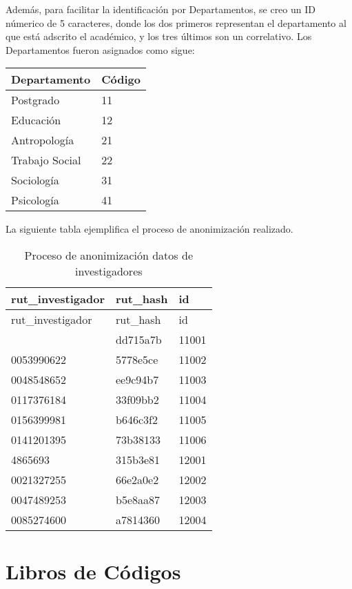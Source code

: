 \documentclass[
  spanish,
  letterpaper,
  DIV=11,
  numbers=noendperiod]{scrreprt}
\begin{document}
Además, para facilitar la identificación por Departamentos, se creo un
ID númerico de 5 caracteres, donde los dos primeros representan el
departamento al que está adscrito el académico, y los tres últimos son
un correlativo. Los Departamentos fueron asignados como sigue:

\begin{longtable}[]{@{}ll@{}}
\toprule\noalign{}
Departamento & Código \\
\midrule\noalign{}
\endhead
\bottomrule\noalign{}
\endlastfoot
Postgrado & 11 \\
Educación & 12 \\
Antropología & 21 \\
Trabajo Social & 22 \\
Sociología & 31 \\
Psicología & 41 \\
\end{longtable}

La siguiente tabla ejemplifica el proceso de anonimización realizado.

\begin{longtable}[]{@{}lll@{}}
\caption{Proceso de anonimización datos de
investigadores}\tabularnewline
\toprule\noalign{}
rut\_investigador & rut\_hash & id \\
\midrule\noalign{}
\endfirsthead
\toprule\noalign{}
rut\_investigador & rut\_hash & id \\
\midrule\noalign{}
\endhead
\bottomrule\noalign{}
\endlastfoot
0029311803 & dd715a7b & 11001 \\
0053990622 & 5778e5ce & 11002 \\
0048548652 & ee9c94b7 & 11003 \\
0117376184 & 33f09bb2 & 11004 \\
0156399981 & b646c3f2 & 11005 \\
0141201395 & 73b38133 & 11006 \\
4865693 & 315b3e81 & 12001 \\
0021327255 & 66e2a0e2 & 12002 \\
0047489253 & b5e8aa87 & 12003 \\
0085274600 & a7814360 & 12004 \\
\end{longtable}

\section{Libros de Códigos}\label{libros-de-cuxf3digos}
\end{document}
